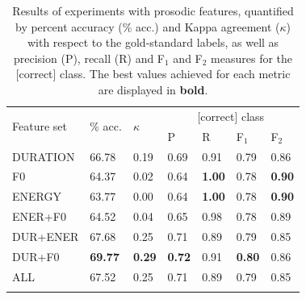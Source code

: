 		\begin{table}
			\centering
			\caption[Results of experiments with prosodic features]{Results of experiments with prosodic features,
			quantified by percent accuracy (\% acc.) and Kappa agreement ($\kappa$) with respect to the gold-standard labels, as well as precision (P), recall (R) and F$_1$ and F$_2$ measures for the [correct] class. 
			The best values achieved for each metric are displayed in \textbf{bold}.
			}
			\begin{tabularx}{.8\textwidth}{lXXXXXX}			
			
			\toprule
			\multirow{2}{*}{Feature set} & \multirow{2}{*}{\% acc.} & \multirow{2}{*}{$\kappa$} & \multicolumn{4}{c}{[correct] class} \\
			 \cmidrule(lr){4-7}
			& & & P & R & F$_1$ & F$_2$ \\
			\midrule
		
DURATION	&	66.78	&	0.19	&	0.69	&	0.91	&	0.79	&	0.86	\\
F0					&	64.37	&	0.02	&	0.64	&	\textbf{1.00}	&	0.78	&	\textbf{0.90}	\\
ENERGY		&	63.77	&	0.00	&	0.64	&	\textbf{1.00}	&	0.78	&	\textbf{0.90}	\\
\addlinespace											
ENER+F0		&	64.52	&	0.04	&	0.65	&	0.98	&	0.78	&	0.89	\\
DUR+ENER	&	67.68	&	0.25	&	0.71	&	0.89	&	0.79	&	0.85	\\
DUR+F0		&	\textbf{69.77}	&	\textbf{0.29}	&	\textbf{0.72}	&	0.91	&	\textbf{0.80}	&	0.86	\\
\addlinespace											
ALL	&	67.52	&	0.25	&	0.71	&	0.89	&	0.79	&	0.85	\\		
			\bottomrule
			\label{tab:results:prosody}
			\end{tabularx}
		\end{table}
		
